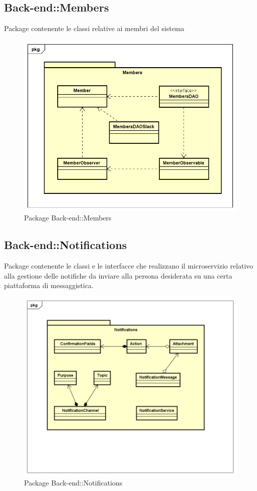 \subsection{Back-end::Members}
Package contenente le classi relative ai membri del sistema
\begin{figure}[h] \centering \includegraphics[width=\textwidth,height=\textheight,keepaspectratio]{images/diagrams/back-end/Official_Backend_0304/Members.png}
\caption{Package Back-end::Members}
\end{figure}
\newpage

\subsection{Back-end::Notifications}
Package contenente le classi e le interfacce che realizzano il microservizio relativo alla gestione delle notifiche da inviare alla persona desiderata su una certa piattaforma di messaggistica.
\begin{figure}[h] \centering \includegraphics[width=\textwidth,height=\textheight,keepaspectratio]{images/diagrams/back-end/Official_Backend_0304/Notifications.png}
\caption{Package Back-end::Notifications}
\end{figure}
\newpage

